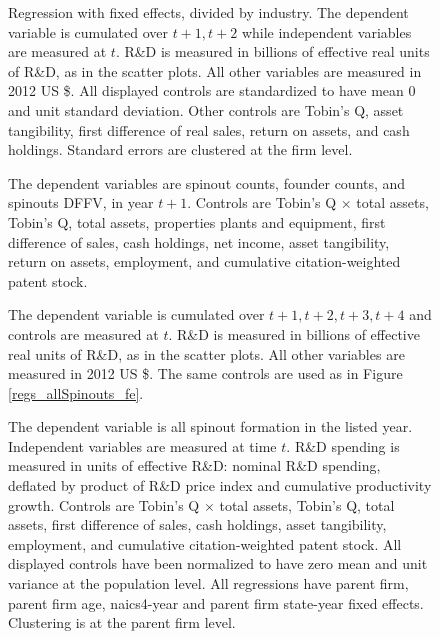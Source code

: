 \documentclass[12pt,english]{article}
\theoremstyle{remark}
\begin{document}
\begin{figure}[p]
	\centering
	
	\caption{Regression with fixed effects, divided by industry. The dependent variable is cumulated over $t+1,t+2$ while independent variables are measured at $t$. R\&D is measured in billions of effective real units of R\&D, as in the scatter plots. All other variables are measured in 2012 US \$. All displayed controls are standardized to have mean 0 and unit standard deviation. Other controls are Tobin's Q, asset tangibility, first difference of real sales, return on assets, and cash holdings. Standard errors are clustered at the firm level.}
	\label{regs_spinouts_wso_fe}
\end{figure}

\begin{figure}[p]
	\centering
	
	\caption{The dependent variables are spinout counts, founder counts, and spinouts DFFV, in year $t+1$. Controls are Tobin's Q $\times$ total assets, Tobin's Q, total assets, properties plants and equipment, first difference of sales, cash holdings, net income, asset tangibility, return on assets, employment, and cumulative citation-weighted patent stock.}
	\label{regs_allspinouts_fe_accounting}
\end{figure}

\begin{figure}[p]
	\centering
	
	\caption{The dependent variable is cumulated over $t+1,t+2,t+3,t+4$ and controls are measured at $t$. R\&D is measured in billions of effective real units of R\&D, as in the scatter plots. All other variables are measured in 2012 US \$. The same controls are used as in Figure \ref{regs_allSpinouts_fe}.}
	\label{regs_spinouts_wso_fe_accounting}
\end{figure}

\begin{figure}[p]
	\centering
	\small
	
	\caption{\small The dependent variable is all spinout formation in the listed year. Independent variables are measured at time $t$. R\&D spending is measured in units of effective R\&D: nominal R\&D spending, deflated by product of R\&D price index and cumulative productivity growth. Controls are Tobin's Q $\times$ total assets, Tobin's Q, total assets, first difference of sales, cash holdings, asset tangibility, employment, and cumulative citation-weighted patent stock. All displayed controls have been normalized to have zero mean and unit variance at the population level. All regressions have parent firm, parent firm age, naics4-year and parent firm state-year fixed effects. Clustering is at the parent firm level.}
	\label{regs_spinouts_accounting}
\end{figure}
\end{document}
